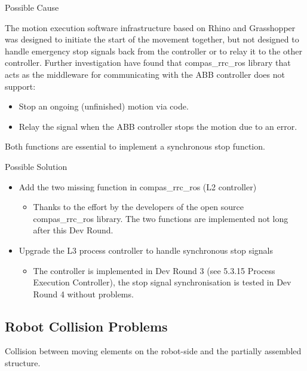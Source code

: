 \begin{itemize}
Possible Cause

The motion execution software infrastructure based on Rhino and Grasshopper was designed to initiate the start of the movement together, but not designed to handle emergency stop signals back from the controller or to relay it to the other controller.
Further investigation have found that compas_rrc_ros library that acts as the middleware for communicating with the ABB controller does not support:
\begin{itemize}
\item Stop an ongoing (unfinished) motion via code.
\item Relay the signal when the ABB controller stops the motion due to an error. 
\end{itemize}

Both functions are essential to implement a synchronous stop function.

Possible Solution

\begin{itemize}
\item Add the two missing function in compas_rrc_ros (L2 controller)
    \begin{itemize}
    \item Thanks to the effort by the developers of the open source compas_rrc_ros library. The two functions are implemented not long after this Dev Round. 
    \end{itemize}
\item Upgrade the L3 process controller to handle synchronous stop signals
    \begin{itemize}
    \item The controller is implemented in Dev Round 3 (see 5.3.15 Process Execution Controller), the stop signal synchronisation is tested in Dev Round 4 without problems.
    \end{itemize}
\end{itemize}

\subsection{Robot Collision Problems}
Collision between moving elements on the robot-side and the partially assembled structure.


\end{itemize}
